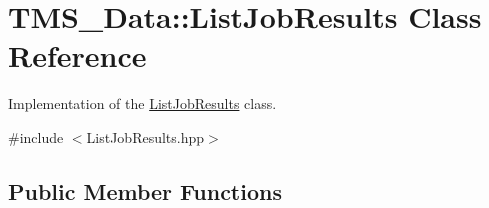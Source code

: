 \hypertarget{classTMS__Data_1_1ListJobResults}{
\section{TMS\_\-Data::ListJobResults Class Reference}
\label{classTMS__Data_1_1ListJobResults}
}


Implementation of the \hyperlink{classTMS__Data_1_1ListJobResults}{ListJobResults} class.  




{\ttfamily \#include $<$ListJobResults.hpp$>$}

\subsection*{Public Member Functions}

